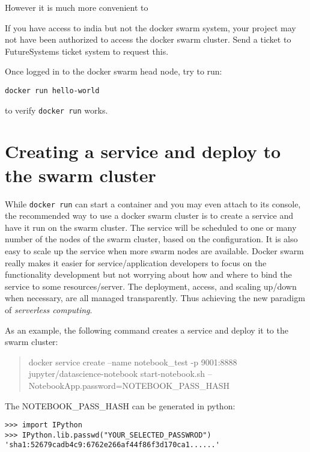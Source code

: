 However it is much more convenient to 

\begin{NOTE}
If you have access to india but not the docker swarm
system, your project may not have been authorized to access the docker
swarm cluster. Send a ticket to FutureSystems ticket system to request
this.
\end{NOTE}

Once logged in to the docker swarm head node, try to run:

\begin{lstlisting}
docker run hello-world
\end{lstlisting}

to verify \verb|docker run| works.

\section{Creating a service and deploy to the swarm cluster}

While \verb|docker run| can start a container and you may even attach to its
console, the recommended way to use a docker swarm cluster is to create
a service and have it run on the swarm cluster. The service will be
scheduled to one or many number of the nodes of the swarm cluster, based
on the configuration. It is also easy to scale up the service when more
swarm nodes are available. Docker swarm really makes it easier for
service/application developers to focus on the functionality development
but not worrying about how and where to bind the service to some
resources/server. The deployment, access, and scaling up/down when
necessary, are all managed transparently. Thus achieving the new
paradigm of \textit{serverless computing}.

As an example, the following command creates a service and deploy it to
the swarm cluster:

\begin{quote}
docker service create --name notebook\_test -p 9001:8888
jupyter/datascience-notebook start-notebook.sh
--NotebookApp.password=NOTEBOOK\_PASS\_HASH
\end{quote}

The NOTEBOOK\_PASS\_HASH can be generated in python:

\begin{lstlisting}
>>> import IPython
>>> IPython.lib.passwd("YOUR_SELECTED_PASSWROD")
'sha1:52679cadb4c9:6762e266af44f86f3d170ca1......'
\end{lstlisting}

